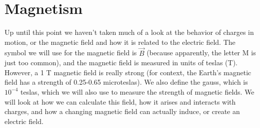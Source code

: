 \section{Magnetism}
Up until this point we haven't taken much of a  look at the behavior of charges in motion, or the magnetic field and how it is related to the electric field. The symbol we will use for the magnetic field is $\vec B$ (because apparently, the letter M is just too common), and the magnetic field is measured in units of teslas (T). However, a 1 T magnetic field is really strong (for context, the Earth's magnetic field has a strength of 0.25-0.65 microteslas). We also define the gauss, which is $10^{-4}$ teslas, which we will also use to measure the strength of magnetic fields. We will look at how we can calculate this field, how it arises and interacts with charges, and how a changing magnetic field can actually induce, or create an electric field. 
